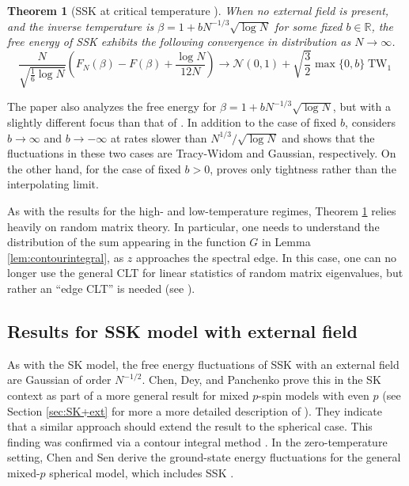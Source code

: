 \documentclass[11pt]{article}
\numberwithin{equation}{section}
\newcommand{\beq}{ \begin{equation} }
\newcommand{\eeq}{ \end{equation} }
\def \b {\beta}
\def \RR {\mathbb{R}}
\def \cN {\mathcal{N}}
\newtheorem{theorem}{Theorem}[section]
\theoremstyle{remark}
\DeclareMathOperator{\TW}{TW}
\begin{document}
\begin{theorem}[SSK at critical temperature \cite{JKOP2}]\label{thm:SSK_crit}
When no external field is present, and the inverse temperature is $\b=1+bN^{-1/3}\sqrt{\log N}$ for some fixed $b\in\RR$, the free energy of SSK exhibits the following convergence in distribution as $N\to\infty$.
\beq
\frac{N}{\sqrt{\frac16\log N}}\left(F_N(\b)-F(\b)+\frac{\log N}{12N}\right)\to\cN(0,1)+\sqrt{\frac32}\max\{0,b\}\TW_1
\eeq
\end{theorem}

The paper \cite{Landon22} also analyzes the free energy for $\b=1+bN^{-1/3}\sqrt{\log N}$, but with a slightly different focus than that of \cite{JKOP2}.  In addition to the case of fixed $b$, \cite{Landon22} considers $b\to\infty$ and $b\to-\infty$ at rates slower than $N^{1/3}/\sqrt{\log N}$ and shows that the fluctuations in these two cases are Tracy-Widom and Gaussian, respectively.  On the other hand, for the case of fixed $b>0$, \cite{Landon22} proves only tightness rather than the interpolating limit.

As with the results for the high- and low-temperature regimes, Theorem \ref{thm:SSK_crit} relies heavily on random matrix theory.  In particular, one needs to understand the distribution of the sum appearing in the function $G$ in Lemma \ref{lem:contourintegral}, as $z$ approaches the spectral edge.  In this case, one can no longer use the general CLT for linear statistics of random matrix eigenvalues, but rather an ``edge CLT'' is needed (see \cite{JKOP1,LambertPaquette21,AugeriButezZeitouni}).

\subsection{Results for SSK model with external field}

As with the SK model, the free energy fluctuations of SSK with an external field are Gaussian of order $N^{-1/2}$.  Chen, Dey, and Panchenko \cite{ChenDeyPanchenko} prove this in the SK context as part of a more general result for mixed $p$-spin models with even $p$ (see Section \ref{sec:SK+ext} for more a more detailed description of \cite{ChenDeyPanchenko}).  They indicate that a similar approach should extend the result to the spherical case.  This finding was confirmed via a contour integral method \cite{Baiketal21,landon2020fluctuations}.  In the zero-temperature setting, Chen and Sen derive the ground-state energy fluctuations for the general mixed-$p$ spherical model, which includes SSK \cite{ChenSen}. 
\end{document}
